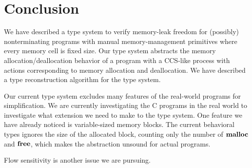 \section{Conclusion}

We have described a type system to verify memory-leak freedom for
(possibly) nonterminating programs with manual memory-management
primitives where every memory cell is fixed size.  Our type system
abstracts the memory allocation/deallocation behavior of a program
with a CCS-like process with actions corresponding to memory
allocation and deallocation.  We have described a type reconstruction
algorithm for the type system.

Our current type system excludes many features of the real-world
programs for simplification.  We are currently investigating the C
programs in the real world to investigate what extension we need to
make to the type system.  One feature we have already noticed is
variable-sized memory blocks.  The current behavioral types ignores
the size of the allocated block, counting only the number of
\(\mathbf{malloc}\) and \(\mathbf{free}\), which makes the abstraction unsound for
actual programs.

Flow sensitivity is another issue we are pursuing.  


